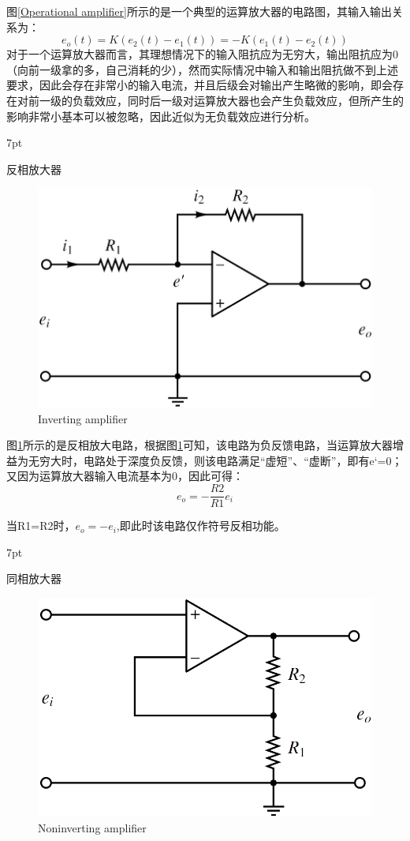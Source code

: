 \documentclass{article}
\numberwithin{equation}{section}
\numberwithin{figure}{section}
\newenvironment{formal}{%
\def\FrameCommand{%
\hspace{1pt}%
{\color{DarkBlue}\vrule width 2pt}%
{\color{formalshade}\vrule width 4pt}%
\colorbox{formalshade}%
}%
\MakeFramed{\advance\hsize-\width\FrameRestore}%
\noindent\hspace{-4.55pt}%
\begin{adjustwidth}{}{7pt}%
\vspace{2pt}\vspace{2pt}%
}
{%
\vspace{2pt}\end{adjustwidth}\endMakeFramed%
}
\begin{document}
图\ref{Operational amplifier}所示的是一个典型的运算放大器的电路图，其输入输出关系为：
\begin{equation}
    e_o(t)=K(e_2(t)-e_1(t))=-K(e_1(t)-e_2(t))
\end{equation}
对于一个运算放大器而言，其理想情况下的输入阻抗应为无穷大，输出阻抗应为0（向前一级拿的多，自己消耗的少），然而实际情况中输入和输出阻抗做不到上述要求，因此会存在非常小的输入电流，并且后级会对输出产生略微的影响，即会存在对前一级的负载效应，同时后一级对运算放大器也会产生负载效应，但所产生的影响非常小基本可以被忽略，因此近似为无负载效应进行分析。

\begin{formal}
    反相放大器
\end{formal}

\begin{figure}
    \centering
    \includegraphics[width=.4\textwidth]{Chapter3/InverterAmplifier.png} %
    \caption{Inverting amplifier} %
    \label{Inverting amplifier} %
\end{figure}

图\ref{Inverting amplifier}所示的是反相放大电路，根据图\ref{Inverting amplifier}可知，该电路为负反馈电路，当运算放大器增益为无穷大时，电路处于深度负反馈，则该电路满足“虚短”、“虚断”，即有e`=0；又因为运算放大器输入电流基本为0，因此可得：
\begin{equation}
    e_o=-\frac{R2}{R1}e_i
\end{equation}

当R1=R2时，$e_o=-e_i$,即此时该电路仅作符号反相功能。

\begin{formal}
    同相放大器
\end{formal}

\begin{figure}
    \centering
    \includegraphics[width=.4\textwidth]{Chapter3/NoninvertingAmplifier.png} %
    \caption{Noninverting amplifier} %
    \label{Noninverting amplifier} %
\end{figure}
\end{document}
